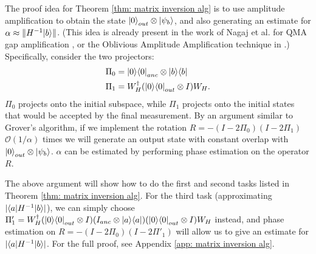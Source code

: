 \documentclass[11pt]{article}
\theoremstyle{definition}
\theoremstyle{remark}
\newcommand\bigoh{\mathcal{O}}
\begin{document}
The proof idea for Theorem \ref{thm: matrix inversion alg} is to use amplitude amplification to obtain the state ${\left\vert{0}\right\rangle}_{out} \otimes {\left\vert{\psi_b}\right\rangle}$, and also generating an estimate for $\alpha \approx \|H^{-1}{\left\vert{b}\right\rangle}\|$. (This idea is already present in the work of Nagaj et al. for QMA gap amplification \cite{nwz11}, or the Oblivious Amplitude Amplification technique in \cite{berry14,bccks15,berry15}.) Specifically, consider the two projectors:
\begin{align}
\Pi_0 &= {\left\vert{0}\right\rangle}{\left\langle{0}\right\vert}_{anc} \otimes {\left\vert{b}\right\rangle}{\left\langle{b}\right\vert} \\
\Pi_1 &= W_H^\dagger ({\left\vert{0}\right\rangle}{\left\langle{0}\right\vert}_{out} \otimes I) W_H.
\end{align}
$\Pi_0$ projects onto the initial subspace, while $\Pi_1$ projects onto the initial states that would be accepted by the final measurement. By an argument similar to Grover's algorithm, if we implement the rotation $R=-(I-2\Pi_0)(I-2\Pi_1)$ $\bigoh (1/\alpha)$ times we will generate an output state with constant overlap with ${\left\vert{0}\right\rangle}_{out} \otimes {\left\vert{\psi_b}\right\rangle}$. $\alpha$ can be estimated by performing phase estimation on the operator $R$.

The above argument will show how to do the first and second tasks listed in Theorem \ref{thm: matrix inversion alg}. For the third task (approximating $|{\left\langle{a}\right\vert}H^{-1}{\left\vert{b}\right\rangle}|$), we can simply choose $\Pi'_1 = W_H^\dagger ({\left\vert{0}\right\rangle}{\left\langle{0}\right\vert}_{out} \otimes I) (I_{anc} \otimes {\left\vert{a}\right\rangle}{\left\langle{a}\right\vert})({\left\vert{0}\right\rangle}{\left\langle{0}\right\vert}_{out} \otimes I) W_H$ instead, and phase estimation on $R=-(I-2\Pi_0)(I-2\Pi'_1)$ will allow us to give an estimate for $|{\left\langle{a}\right\vert}H^{-1}{\left\vert{b}\right\rangle}|$. For the full proof, see Appendix \ref{app: matrix inversion alg}.
\end{document}
